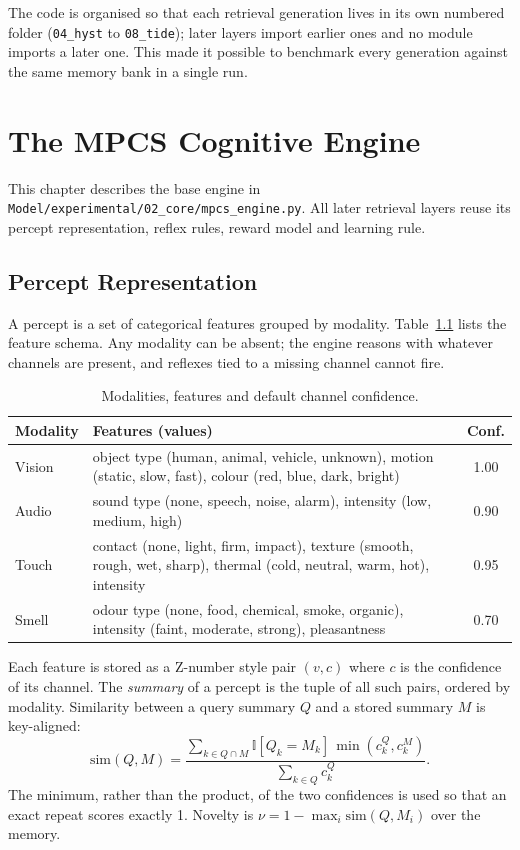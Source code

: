\documentclass[12pt,a4paper,oneside]{report}
\newcommand{\code}[1]{\texttt{\small #1}}
\begin{document}
\noindent The code is organised so that each retrieval generation lives in its own numbered folder (\code{04\_hyst} to \code{08\_tide}); later layers import earlier ones and no module imports a later one. This made it possible to benchmark every generation against the same memory bank in a single run.

\chapter{The MPCS Cognitive Engine}\label{ch:core}
This chapter describes the base engine in \code{Model/experimental/02\_core/mpcs\_engine.py}. All later retrieval layers reuse its percept representation, reflex rules, reward model and learning rule.

\section{Percept Representation}
A percept is a set of categorical features grouped by modality. Table~\ref{tab:modalities} lists the feature schema. Any modality can be absent; the engine reasons with whatever channels are present, and reflexes tied to a missing channel cannot fire.

\begin{table}[H]
\centering
\caption{Modalities, features and default channel confidence.}
\label{tab:modalities}
\small
\begin{tabularx}{\linewidth}{@{}l X c@{}}
\toprule
Modality & Features (values) & Conf.\\
\midrule
Vision & object type (human, animal, vehicle, unknown), motion (static, slow, fast), colour (red, blue, dark, bright) & 1.00\\
Audio & sound type (none, speech, noise, alarm), intensity (low, medium, high) & 0.90\\
Touch & contact (none, light, firm, impact), texture (smooth, rough, wet, sharp), thermal (cold, neutral, warm, hot), intensity & 0.95\\
Smell & odour type (none, food, chemical, smoke, organic), intensity (faint, moderate, strong), pleasantness & 0.70\\
\bottomrule
\end{tabularx}
\end{table}

Each feature is stored as a Z-number style pair $(v, c)$ where $c$ is the confidence of its channel. The \emph{summary} of a percept is the tuple of all such pairs, ordered by modality. Similarity between a query summary $Q$ and a stored summary $M$ is key-aligned:
\begin{equation}
  \mathrm{sim}(Q, M) = \frac{\sum_{k \in Q \cap M} \mathbb{I}[Q_k = M_k]\,\min(c^Q_k, c^M_k)}{\sum_{k \in Q} c^Q_k}.
\end{equation}
The minimum, rather than the product, of the two confidences is used so that an exact repeat scores exactly 1. Novelty is $\nu = 1 - \max_i \mathrm{sim}(Q, M_i)$ over the memory.
\end{document}
